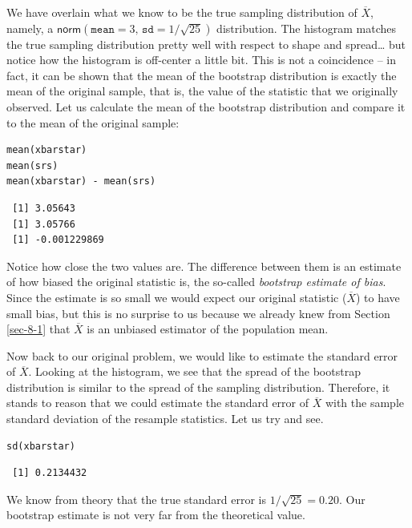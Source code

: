 \documentclass[captions=tableheading]{scrbook}
\begin{document}
\begin{example}
We have overlain what we know to be the true sampling distribution of \(\overline{X}\), namely, a \(\mathsf{norm}(\mathtt{mean}=3,\,\mathtt{sd}=1/\sqrt{25})\) distribution. The histogram matches the true sampling distribution pretty well with respect to shape and spread\ldots{} but notice how the histogram is off-center a little bit. This is not a coincidence -- in fact, it can be shown that the mean of the bootstrap distribution is exactly the mean of the original sample, that is, the value of the statistic that we originally observed. Let us calculate the mean of the bootstrap distribution and compare it to the mean of the original sample:


\lstset{language=R}
\begin{lstlisting}
mean(xbarstar)
mean(srs)
mean(xbarstar) - mean(srs)
\end{lstlisting}

\begin{verbatim}
 [1] 3.05643
 [1] 3.05766
 [1] -0.001229869
\end{verbatim}

\end{example}

Notice how close the two values are. The difference between them is an estimate of how biased the original statistic is, the so-called \emph{bootstrap estimate of bias}. Since the estimate is so small we would expect our original statistic (\(\overline{X}\)) to have small bias, but this is no surprise to us because we already knew from Section \ref{sec-8-1} that \(\overline{X}\) is an unbiased estimator of the population mean.

Now back to our original problem, we would like to estimate the standard error of \(\overline{X}\). Looking at the histogram, we see that the spread of the bootstrap distribution is similar to the spread of the sampling distribution. Therefore, it stands to reason that we could estimate the standard error of \(\overline{X}\) with the sample standard deviation of the resample statistics. Let us try and see.


\lstset{language=R}
\begin{lstlisting}
sd(xbarstar)
\end{lstlisting}

\begin{verbatim}
 [1] 0.2134432
\end{verbatim}

We know from theory that the true standard error is \(1/\sqrt{25}=0.20\). Our bootstrap estimate is not very far from the theoretical value. 
\end{document}

